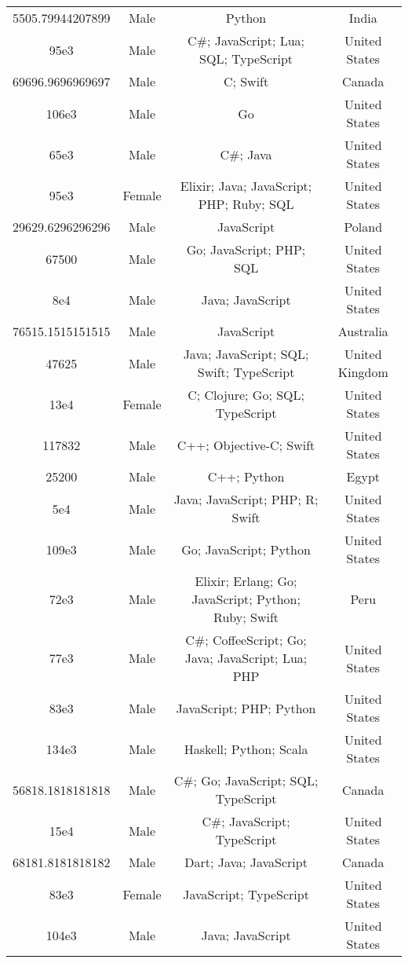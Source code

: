 \begin{center}
\begin{tabular}{ |c|c|c|c| }
5505.79944207899  &  Male  &  Python  &  India  \\ 
95e3  &  Male  &  C\#; JavaScript; Lua; SQL; TypeScript  &  United States  \\ 
69696.9696969697  &  Male  &  C; Swift  &  Canada  \\ 
106e3  &  Male  &  Go  &  United States  \\ 
65e3  &  Male  &  C\#; Java  &  United States  \\ 
95e3  &  Female  &  Elixir; Java; JavaScript; PHP; Ruby; SQL  &  United States  \\ 
29629.6296296296  &  Male  &  JavaScript  &  Poland  \\ 
67500  &  Male  &  Go; JavaScript; PHP; SQL  &  United States  \\ 
8e4  &  Male  &  Java; JavaScript  &  United States  \\ 
76515.1515151515  &  Male  &  JavaScript  &  Australia  \\ 
47625  &  Male  &  Java; JavaScript; SQL; Swift; TypeScript  &  United Kingdom  \\ 
13e4  &  Female  &  C; Clojure; Go; SQL; TypeScript  &  United States  \\ 
117832  &  Male  &  C++; Objective-C; Swift  &  United States  \\ 
25200  &  Male  &  C++; Python  &  Egypt  \\ 
5e4  &  Male  &  Java; JavaScript; PHP; R; Swift  &  United States  \\ 
109e3  &  Male  &  Go; JavaScript; Python  &  United States  \\ 
72e3  &  Male  &  Elixir; Erlang; Go; JavaScript; Python; Ruby; Swift  &  Peru  \\ 
77e3  &  Male  &  C\#; CoffeeScript; Go; Java; JavaScript; Lua; PHP  &  United States  \\ 
83e3  &  Male  &  JavaScript; PHP; Python  &  United States  \\ 
134e3  &  Male  &  Haskell; Python; Scala  &  United States  \\ 
56818.1818181818  &  Male  &  C\#; Go; JavaScript; SQL; TypeScript  &  Canada  \\ 
15e4  &  Male  &  C\#; JavaScript; TypeScript  &  United States  \\ 
68181.8181818182  &  Male  &  Dart; Java; JavaScript  &  Canada  \\ 
83e3  &  Female  &  JavaScript; TypeScript  &  United States  \\ 
104e3  &  Male  &  Java; JavaScript  &  United States  \\ 

\end{tabular}
\end{center}
